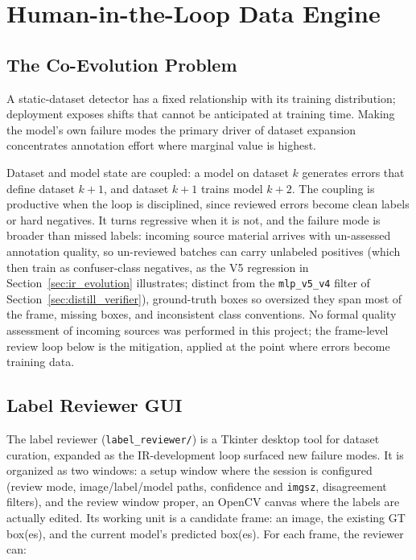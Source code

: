 \section{Human-in-the-Loop Data Engine}
\label{sec:hitl_method}

\subsection{The Co-Evolution Problem}
\label{sec:coevolution}

A static-dataset detector has a fixed relationship with its training distribution; deployment exposes shifts that cannot be anticipated at training time. Making the model's own failure modes the primary driver of dataset expansion concentrates annotation effort where marginal value is highest.

Dataset and model state are coupled: a model on dataset $k$ generates errors that define dataset $k+1$, and dataset $k+1$ trains model $k+2$. The coupling is productive when the loop is disciplined, since reviewed errors become clean labels or hard negatives. It turns regressive when it is not, and the failure mode is broader than missed labels: incoming source material arrives with un-assessed annotation quality, so un-reviewed batches can carry unlabeled positives (which then train as confuser-class negatives, as the V5 regression in Section~\ref{sec:ir_evolution} illustrates; distinct from the \texttt{mlp\_v5\_v4} filter of Section~\ref{sec:distill_verifier}), ground-truth boxes so oversized they span most of the frame, missing boxes, and inconsistent class conventions. No formal quality assessment of incoming sources was performed in this project; the frame-level review loop below is the mitigation, applied at the point where errors become training data.

\subsection{Label Reviewer GUI}
\label{sec:label_reviewer}

The label reviewer (\texttt{label\_reviewer/}) is a Tkinter desktop tool for dataset curation, expanded as the IR-development loop surfaced new failure modes. It is organized as two windows: a setup window where the session is configured (review mode, image/label/model paths, confidence and \texttt{imgsz}, disagreement filters), and the review window proper, an OpenCV canvas where the labels are actually edited. Its working unit is a candidate frame: an image, the existing GT box(es), and the current model's predicted box(es). For each frame, the reviewer can:


